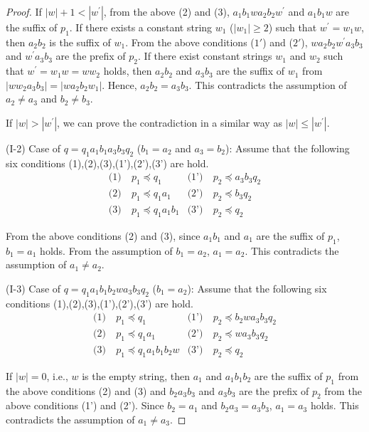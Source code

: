\begin{proof}
If $|w|+1 < |w^{\prime}|$, from the above (2) and (3), 
$a_{1}b_{1}wa_{2}b_{2}w^{\prime}$ and $a_{1}b_{1}w$ are the suffix of $p_{1}$.
If there exists a constant string $w_{1}$ ($|w_{1}|\geq 2$) such that $w^{\prime}=w_{1}w$, then $a_{2}b_{2}$ is the suffix of $w_{1}$.
From  the above conditions ($1'$) and ($2'$), 
$wa_{2}b_{2}w^{\prime}a_{3}b_{3}$ and $w^{\prime}a_{3}b_{3}$ are the prefix of $p_{2}$.
If there exist constant strings $w_{1}$ and $w_{2}$ such that $w^{\prime} = w_{1}w=ww_{2}$ holds, then $a_{2}b_{2}$ and $a_{3}b_{3}$ are the suffix of $w_{1}$ from $|ww_{2}a_{3}b_{3}|=|wa_{2}b_{2}w_{1}|$.
Hence, $a_{2}b_{2}=a_{3}b_{3}$.
This contradicts the assumption of $a_{2} \ne a_{3}$ and $b_{2} \ne b_{3}$.

If $|w|>|w^{\prime}|$, we can prove the contradiction in a similar way as $|w|\le|w^{\prime}|$.

\smallskip

\noindent
(I-2) Case of $q=q_{1}a_{1}b_{1}a_{3}b_{3}q_{2}$ ($b_{1}=a_{2}$ and $a_{3}=b_{2}$):
Assume that the following six conditions (1),(2),(3),(1'),(2'),(3') are hold.
\begin{align*}
\textrm{(1)}~& p_{1} \preceq q_{1} & \textrm{(1')}~& p_{2} \preceq a_{3}b_{3}q_{2} \\
\textrm{(2)}~& p_{1} \preceq q_{1}a_{1} & \textrm{(2')}~& p_{2} \preceq b_{3}q_{2} \\
\textrm{(3)}~& p_{1} \preceq q_{1}a_{1}b_{1} & \textrm{(3')}~& p_{2} \preceq q_{2}
\end{align*}

\noindent
From the above conditions (2) and (3), since $a_{1}b_{1}$ and $a_{1}$ are the suffix of $p_{1}$, 
$b_{1} = a_{1}$ holds.
From the assumption of $b_{1}=a_{2}$, $a_{1}=a_{2}$.
This contradicts the assumption of $a_{1}\not= a_{2}$.
\smallskip

\noindent
(I-3) Case of $q=q_{1}a_{1}b_{1}b_{2}wa_{3}b_{3}q_{2}$ ($b_{1}=a_{2}$):
Assume that the following six conditions (1),(2),(3),(1'),(2'),(3') are hold.
\begin{align*}
\textrm{(1)}~& p_{1} \preceq q_{1} & \textrm{(1')}~& p_{2} \preceq b_{2}wa_{3}b_{3}q_{2} \\
\textrm{(2)}~& p_{1} \preceq q_{1}a_{1} & \textrm{(2')}~& p_{2} \preceq wa_{3}b_{3}q_{2} \\
\textrm{(3)}~& p_{1} \preceq q_{1}a_{1}b_{1}b_{2}w & \textrm{(3')}~& p_{2} \preceq q_{2}
\end{align*}

If $|w|=0$, i.e., $w$ is the empty string, then $a_{1}$ and $a_{1}b_{1}b_{2}$ are the suffix of $p_{1}$ from the above conditions (2) and (3)
and $b_{2}a_{3}b_{3}$ and $a_{3}b_{3}$ are the prefix of $p_{2}$ from the above conditions (1') and (2').
Since $b_{2}=a_{1}$ and $b_{2}a_{3}=a_{3}b_{3}$, $a_{1}=a_{3}$ holds.
This contradicts the assumption of $a_{1}\not= a_{3}$.


\end{proof}
